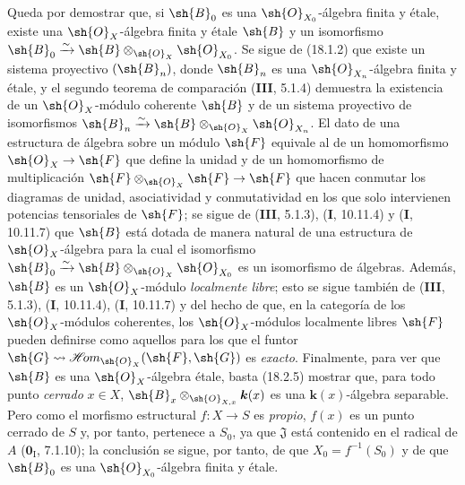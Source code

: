 Queda por demostrar que, si $\sh{B}_0$ es una $\sh{O}_{X_0}$-álgebra finita y étale, existe una $\sh{O}_X$-álgebra finita y étale $\sh{B}$ y un isomorfismo $\sh{B}_0\xrightarrow{\sim}\sh{B}\otimes_{\sh{O}_X}\sh{O}_{X_0}$. Se sigue de (18.1.2) que existe un sistema proyectivo $(\sh{B}_n)$, donde $\sh{B}_n$ es una $\sh{O}_{X_n}$-álgebra finita y étale, y el segundo teorema de comparación (\textbf{III}, 5.1.4) demuestra la existencia de un $\sh{O}_X$-módulo coherente $\sh{B}$ y de un sistema proyectivo de isomorfismos $\sh{B}_n\xrightarrow{\sim}\sh{B}\otimes_{\sh{O}_X}\sh{O}_{X_n}$. El dato de una estructura de álgebra sobre un módulo $\sh{F}$ equivale al de un homomorfismo $\sh{O}_X\to\sh{F}$ que define la unidad y de un homomorfismo de multiplicación $\sh{F}\otimes_{\sh{O}_X}\sh{F}\to\sh{F}$ que hacen conmutar los diagramas de unidad, asociatividad y conmutatividad en los que solo intervienen potencias tensoriales de $\sh{F}$; se sigue de (\textbf{III}, 5.1.3), (\textbf I, 10.11.4) y (\textbf I, 10.11.7) que $\sh{B}$ está dotada de manera natural de una estructura de $\sh{O}_X$-álgebra para la cual el isomorfismo $\sh{B}_0\xrightarrow{\sim}\sh{B}\otimes_{\sh{O}_X}\sh{O}_{X_0}$ es un isomorfismo de álgebras. Además, $\sh{B}$ es un $\sh{O}_X$-módulo \emph{localmente libre}; esto se sigue también de (\textbf{III}, 5.1.3), (\textbf I, 10.11.4), (\textbf I, 10.11.7) y del hecho de que, en la categoría de los $\sh{O}_X$-módulos coherentes, los $\sh{O}_X$-módulos localmente libres $\sh{F}$ pueden definirse como aquellos para los que el funtor $\sh{G}\leadsto\mathscr{H}\!om_{\sh{O}_X}(\sh{F},\sh{G})$ es \emph{exacto}. Finalmente, para ver que $\sh{B}$ es una $\sh{O}_X$-álgebra étale, basta (18.2.5) mostrar que, para todo punto \emph{cerrado} $x\in X$, $\sh{B}_x\otimes_{\sh{O}_{X,x}}\boldsymbol{k}(x)$ es una $\boldsymbol{k}(x)$-álgebra separable. Pero como el morfismo estructural $f:X\to S$ es \emph{propio}, $f(x)$ es un punto cerrado de $S$ y, por tanto, pertenece a $S_0$, ya que $\mathfrak J$ está contenido en el radical de $A$ ($\mathbf{0}_{\mathrm I}$, 7.1.10); la conclusión se sigue, por tanto, de que $X_0=f^{-1}(S_0)$ y de que $\sh{B}_0$ es una $\sh{O}_{X_0}$-álgebra finita y étale.

